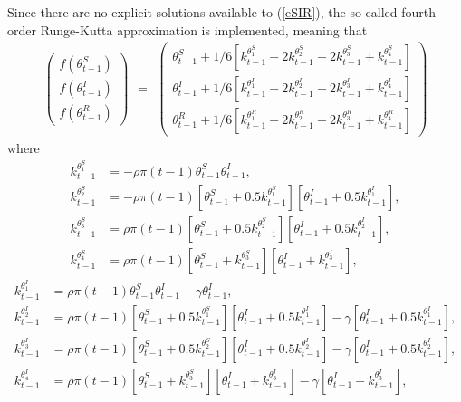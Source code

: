 \documentclass[10pt,a4paper]{article}
\begin{document}
Since there are no explicit solutions available to (\ref{eSIR}), the so-called fourth-order Runge-Kutta approximation is implemented, meaning that 
%
$$
\begin{aligned}
	\begin{pmatrix}
		f(\theta_{t-1}^S) \\
		f(\theta_{t-1}^I) \\
		f(\theta_{t-1}^R)
	\end{pmatrix}
\end{aligned} = 
%
\begin{aligned}
	\begin{pmatrix}
		\theta_{t-1}^S + 1/6[k_{t-1}^{\theta^S_1} + 2k_{t-1}^{\theta^S_2} + 2k_{t-1}^{\theta^S_3} + k_{t-1}^{\theta^S_4}] \\
		\theta_{t-1}^I + 1/6[k_{t-1}^{\theta^I_1} + 2k_{t-1}^{\theta^I_2} + 2k_{t-1}^{\theta^I_3} + k_{t-1}^{\theta^I_4}] \\
		\theta_{t-1}^R + 1/6[k_{t-1}^{\theta^R_1} + 2k_{t-1}^{\theta^R_2} + 2k_{t-1}^{\theta^R_3} + k_{t-1}^{\theta^R_4}]
	\end{pmatrix}
\end{aligned}
$$
%
where 
%
\begin{equation*}
\begin{split}	
		k_{t-1}^{\theta^S_1} &= - \rho\pi(t-1) \theta_{t-1}^S \theta_{t-1}^I, \\
		k_{t-1}^{\theta^S_2} &= - \rho\pi(t-1) [\theta_{t-1}^S + 0.5 k_{t-1}^{\theta^S_1}] [\theta_{t-1}^I + 0.5 k_{t-1}^{\theta^I_1}], \\
		k_{t-1}^{\theta^S_3} &= \rho\pi(t-1) [\theta_{t-1}^S + 0.5 k_{t-1}^{\theta^S_2}] [\theta_{t-1}^I + 0.5 k_{t-1}^{\theta^I_2}], \\
		k_{t-1}^{\theta^S_4} &= \rho\pi(t-1) [\theta_{t-1}^S + k_{t-1}^{\theta^S_3}] [\theta_{t-1}^I + k_{t-1}^{\theta^I_3}],
\end{split}
\end{equation*}
%
\begin{equation*}
	\begin{split}	
		k_{t-1}^{\theta^I_1} &= \rho\pi(t-1) \theta_{t-1}^S \theta_{t-1}^I - \gamma \theta^I_{t-1}, \\
		k_{t-1}^{\theta^I_2} &= \rho\pi(t-1) [\theta_{t-1}^S + 0.5 k_{t-1}^{\theta^S_1}] [\theta_{t-1}^I + 0.5 k_{t-1}^{\theta^I_1}] - \gamma[\theta_{t-1}^I + 0.5 k_{t-1}^{\theta^I_1}], \\
		k_{t-1}^{\theta^I_3} &= \rho\pi(t-1) [\theta_{t-1}^S + 0.5 k_{t-1}^{\theta^S_2}] [\theta_{t-1}^I + 0.5 k_{t-1}^{\theta^I_2}] - \gamma[\theta_{t-1}^I + 0.5 k_{t-1}^{\theta^I_2}], \\
		k_{t-1}^{\theta^I_4} &= \rho\pi(t-1) [\theta_{t-1}^S + k_{t-1}^{\theta^S_3}] [\theta_{t-1}^I + k_{t-1}^{\theta^I_3}] - \gamma[\theta_{t-1}^I + k_{t-1}^{\theta^I_3}], 
	\end{split}
\end{equation*}
\end{document}
